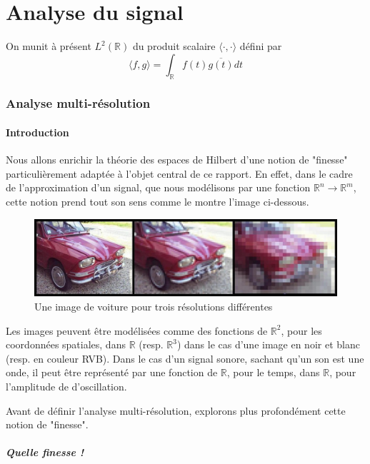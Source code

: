 \documentclass[]{article}
\theoremstyle{remark}
\theoremstyle{definition}
\begin{document}
	\part{Analyse du signal}
	
	On munit à présent $L^2(\mathbb{R})$ du produit scalaire $\langle \cdot, \cdot \rangle$ défini par $$\langle f, g\rangle = \int_\mathbb{R} f(t) \overline{g(t)} dt$$
	
	\section{Analyse multi-résolution}
	
	\subsection{Introduction}
	
	Nous allons enrichir la théorie des espaces de Hilbert d'une notion de "finesse"  particulièrement adaptée à l'objet central de ce rapport. En effet, dans le cadre de l'approximation d'un signal, que nous modélisons par une fonction $\mathbb{R}^n \rightarrow \mathbb{R}^m$, cette notion prend tout son sens comme le montre l'image ci-dessous.
	
	\begin{figure}[h]
		\centering
		\includegraphics[width=350pt]{Resolution_wikipedia.jpg}
		\caption{Une image de voiture pour trois résolutions différentes}
	\end{figure}
	
	Les images peuvent être modélisées comme des fonctions de $\mathbb{R}^2$, pour les coordonnées spatiales, dans $\mathbb{R}$ (resp. $\mathbb{R}^3$) dans le cas d'une image en noir et blanc (resp. en couleur RVB). Dans le cas d'un signal sonore, sachant qu'un son est une onde, il peut être représenté par une fonction de $\mathbb{R}$, pour le temps, dans $\mathbb{R}$, pour l'amplitude de d'oscillation.
	
	Avant de définir l'analyse multi-résolution, explorons plus profondément cette notion de "finesse".
	
	\subsubsection*{Quelle finesse !}
	
\end{document}
